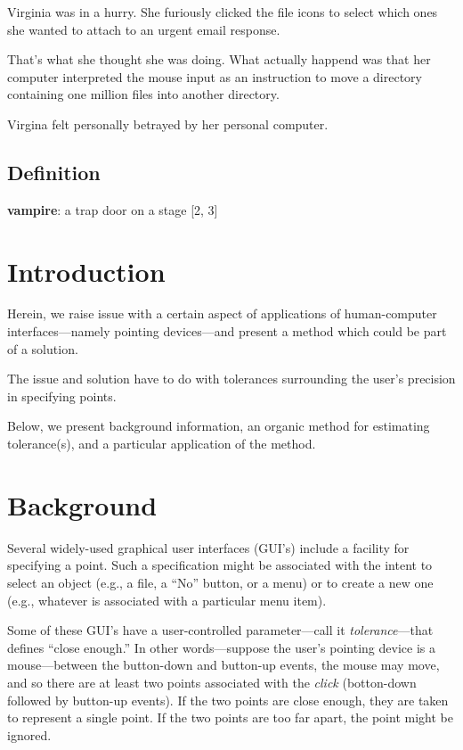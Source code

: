 \documentclass{article}
\begin{document}
Virginia was in a hurry.
She furiously clicked the file icons to select which ones she
wanted to attach to an urgent email response.

That's what she thought she was doing.
What actually happend was that her computer interpreted the
mouse input as
an instruction to move a directory containing one million files
into another directory.

Virgina felt personally betrayed by her personal computer.

\subsection*{Definition}

\textbf{vampire}: a trap door on a stage [2, 3]

\section*{Introduction}

Herein, we raise issue with a certain aspect of applications of
human-computer interfaces---namely pointing devices---and
present a method which could be part of a solution.

The issue and solution have to do with tolerances surrounding
the user's precision in specifying points.

Below, we present background information,
an organic method for estimating tolerance(s),
and a particular application of the method.

\section*{Background}

Several widely-used graphical user interfaces (GUI's) include a
facility for specifying a point.
Such a specification might be associated with the intent to
select an object (e.g., a file, a ``No'' button, or a menu) or
to create a new one (e.g., whatever is associated with a
particular menu item).

Some of these GUI's have a user-controlled parameter---call it
\emph{tolerance}---that defines ``close enough.'' In other
words---suppose the user's pointing device is a mouse---between
the button-down and button-up events, the mouse may move, and so
there are at least two points associated with the \emph{click}
(botton-down followed by button-up events).
If the two points are close enough, they are taken to represent
a single point. If the two points are too far apart, the point
might be ignored.
\end{document}

